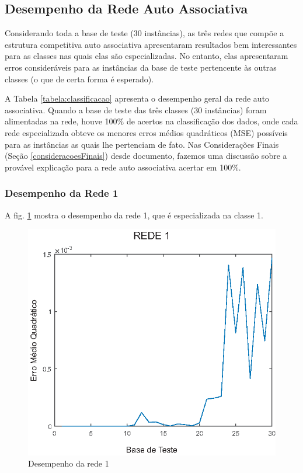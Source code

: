 \subsection{Desempenho da Rede Auto Associativa}

Considerando toda a base de teste (30 instâncias), as três redes que compõe a estrutura competitiva auto associativa apresentaram resultados bem interessantes para as classes nas quais elas são especializadas. No entanto, elas apresentaram erros consideráveis para as instâncias da base de teste pertencente às outras classes (o que de certa forma é esperado).



A Tabela \ref{tabela:classificacao} apresenta o desempenho geral da rede auto associativa. Quando a base de teste das três classes (30 instâncias) foram alimentadas na rede, houve 100\% de acertos na classificação dos dados, onde cada rede especializada obteve os menores erros médios quadráticos (MSE) possíveis para as instâncias as quais lhe pertenciam de fato. Nas Considerações Finais (Seção \ref{consideracoesFinais}) desde documento, fazemos uma discussão sobre a provável explicação para a rede auto associativa acertar em 100\%.

\subsubsection{Desempenho da Rede 1}

A fig. \ref{figura:rede1} mostra o desempenho da rede 1, que é especializada na classe 1.

\begin{figure}[H]

\centering %
\includegraphics{04-Figuras/MSE_DesempenhoNet1}

\caption{Desempenho da rede 1}

\label{figura:rede1}

\end{figure}

